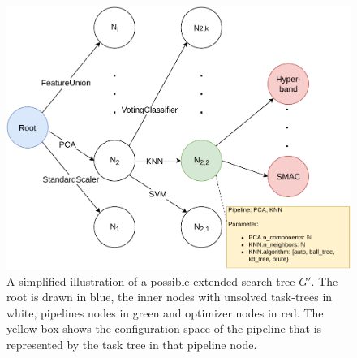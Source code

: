 \begin{figure}[ht!]
    \centering
    \includegraphics[width=\textwidth]{gfx/Figures/Approach/SearchGraph.pdf}
    \caption{A simplified illustration of a possible extended search tree $G'$.
    The root is drawn in blue, the inner nodes with unsolved task-trees in white, pipelines nodes in green and optimizer nodes in red.
    The yellow box shows the configuration space of the pipeline that is represented by the task tree in that pipeline node.}
    \label{fig:appraoch:search-graph}
\end{figure}

